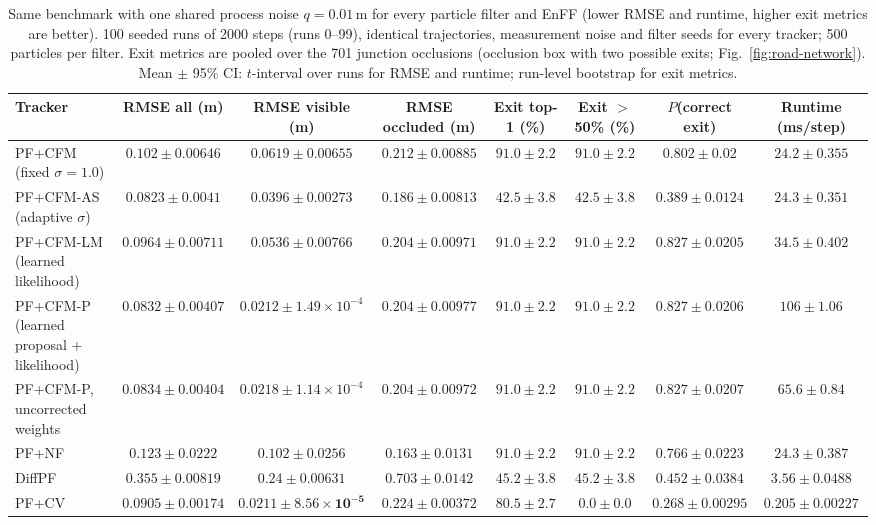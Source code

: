 \begin{table}[ht]
\centering
\small
\caption{Same benchmark with one shared process noise $q{=}0.01$\,m for every particle filter and EnFF (lower RMSE and runtime, higher exit metrics are better). 100 seeded runs of 2000 steps (runs 0--99), identical trajectories, measurement noise and filter seeds for every tracker; 500 particles per filter. Exit metrics are pooled over the 701 junction occlusions (occlusion box with two possible exits; Fig.~\ref{fig:road-network}). Mean $\pm$ 95\% CI: $t$-interval over runs for RMSE and runtime; run-level bootstrap for exit metrics.}
\label{tab:exit-benchmark-shared}
\begin{adjustbox}{max width=\linewidth}
\begin{tabular}{lccccccc}
\toprule
Tracker & RMSE all (m) & RMSE visible (m) & RMSE occluded (m) & Exit top-1 (\%) & Exit $>$50\% (\%) & $P$(correct exit) & Runtime (ms/step) \\
\midrule
PF+CFM (fixed $\sigma{=}1.0$) & $0.102\pm0.00646$ & $0.0619\pm0.00655$ & $0.212\pm0.00885$ & $\mathbf{91.0\pm2.2}$ & $\mathbf{91.0\pm2.2}$ & $0.802\pm0.02$ & $24.2\pm0.355$ \\
PF+CFM-AS (adaptive $\sigma$) & $\mathbf{0.0823\pm0.0041}$ & $0.0396\pm0.00273$ & $0.186\pm0.00813$ & $42.5\pm3.8$ & $42.5\pm3.8$ & $0.389\pm0.0124$ & $24.3\pm0.351$ \\
PF+CFM-LM (learned likelihood) & $0.0964\pm0.00711$ & $0.0536\pm0.00766$ & $0.204\pm0.00971$ & $\mathbf{91.0\pm2.2}$ & $\mathbf{91.0\pm2.2}$ & $0.827\pm0.0205$ & $34.5\pm0.402$ \\
PF+CFM-P (learned proposal + likelihood) & $0.0832\pm0.00407$ & $0.0212\pm1.49\times10^{-4}$ & $0.204\pm0.00977$ & $\mathbf{91.0\pm2.2}$ & $\mathbf{91.0\pm2.2}$ & $0.827\pm0.0206$ & $106\pm1.06$ \\
PF+CFM-P, uncorrected weights & $0.0834\pm0.00404$ & $0.0218\pm1.14\times10^{-4}$ & $0.204\pm0.00972$ & $\mathbf{91.0\pm2.2}$ & $\mathbf{91.0\pm2.2}$ & $0.827\pm0.0207$ & $65.6\pm0.84$ \\
\midrule
PF+NF & $0.123\pm0.0222$ & $0.102\pm0.0256$ & $\mathbf{0.163\pm0.0131}$ & $\mathbf{91.0\pm2.2}$ & $\mathbf{91.0\pm2.2}$ & $0.766\pm0.0223$ & $24.3\pm0.387$ \\
DiffPF & $0.355\pm0.00819$ & $0.24\pm0.00631$ & $0.703\pm0.0142$ & $45.2\pm3.8$ & $45.2\pm3.8$ & $0.452\pm0.0384$ & $3.56\pm0.0488$ \\
PF+CV & $0.0905\pm0.00174$ & $\mathbf{0.0211\pm8.56\times10^{-5}}$ & $0.224\pm0.00372$ & $80.5\pm2.7$ & $0.0\pm0.0$ & $0.268\pm0.00295$ & $\mathbf{0.205\pm0.00227}$ \\

\end{tabular}
\end{adjustbox}
\end{table}
